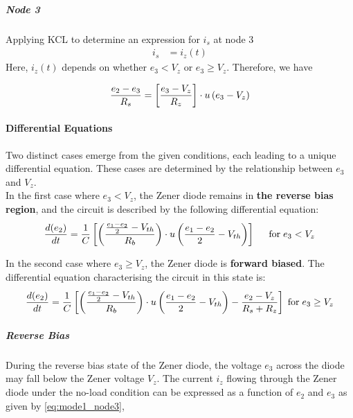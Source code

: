 \subparagraph{Node \textcircled{3}}
Applying KCL to determine an expression for $i_s$ at node \textcircled{3}
\begin{equation}
    \begin{split}
        i_s &= i_z(t)
    \end{split}
\end{equation}
Here, \(i_z(t)\) depends on whether \(e_3 < V_z\) or \(e_3 \geq V_z\). Therefore, we have

\begin{equation}
    \frac{e_2 - e_3}{R_s} = \left[\frac{e_3 - V_z}{R_z} \right]\cdot u\left(e_3 - V_z \right)
    \label{eq:mode1_node3}
\end{equation}

\paragraph{Differential Equations}
Two distinct cases emerge from the given conditions, each leading to a unique differential equation. These cases are determined by the relationship between \(e_3\) and \(V_z\).\\

In the first case where \(e_3 < V_z\), the Zener diode remains in \textbf{the reverse bias region}, and the circuit is described by the following differential equation:
\begin{equation}
    \frac{d(e_2)}{dt}=\frac{1}{C} \left[\left(\frac{\frac{e_1 - e_2}{2} - V_{th}}{R_b} \right) \cdot u\left(\frac{e_1-e_2}{2}-V_{th} \right) \right] \hspace{0.5cm} \text{for} \hspace{0.1cm} e_3 < V_z
\end{equation}

In the second case where \(e_3 \geq V_z\), the Zener diode is \textbf{forward biased}. The differential equation characterising the circuit in this state is:
\begin{equation}
   \frac{d(e_2)}{dt}=\frac{1}{C}\left[\left(\frac{\frac{e_1 - e_2}{2} - V_{th}}{R_b} \right)\cdot u\left(\frac{e_1 - e_2}{2} - V_{th} \right)-\frac{e_2-V_z}{R_s+R_z} \right] \hspace{0.1cm} \text{for} \hspace{0.1cm} e_3 \geq V_z
\end{equation}

\subparagraph{Reverse Bias}
During the reverse bias state of the Zener diode, the voltage $e_3$ across the diode may fall below the Zener voltage $V_z$. The current $i_z$ flowing through the Zener diode under the no-load condition can be expressed as a function of $e_2$ and $e_3$ as given by \eqref{eq:mode1_node3},

